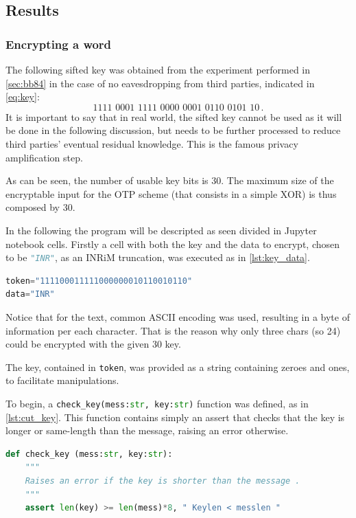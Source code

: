 \subsection{Results}

\subsubsection{Encrypting a word}
The following sifted key was obtained from the experiment performed in
\cref{sec:bb84} in the case of no eavesdropping from
third parties, indicated in \cref{eq:key}:
\begin{equation*}
  1111 \,\,  0001 \,\, 1111 \,\, 0000 \,\, 0001 \,\, 0110 \,\,
  0101 \,\, 10 \, .
\end{equation*}
It is important to say that in real world, the sifted  key
cannot be used as it will be done in the  following discussion,
but needs to be further
processed to reduce third parties' eventual residual knowledge. This
is the famous privacy
amplification step.

As can be seen, the number of usable key bits is 30.
The maximum size of the encryptable input for the OTP scheme
(that consists in a simple XOR) is thus
composed by \SI{30}{\bit}.

In the following the program will be descripted as seen divided in
Jupyter notebook cells. Firstly a cell with both the key
and the data to encrypt,
chosen to be \lstinline[language=Python]|"INR"|, as an INRiM
truncation, was executed as in
\cref{lst:key_data}.
\begin{lstlisting}[basicstyle=\ttfamily\footnotesize, language=python, caption=Cell with the initial data. , label=lst:key_data, float=h ]
token="111100011111000000010110010110"
data="INR"
\end{lstlisting}
Notice that for the text, common ASCII encoding was used, resulting
in a byte of information per each character.
That is the reason why only three chars (so \SI{24}{\bit}) could be
encrypted with the given  \SI{30}{\bit} key.

The key, contained in \lstinline[language=python]|token|, was provided
as a string containing zeroes and ones, to
facilitate manipulations.

To begin, a \lstinline[language=Python]|check_key(mess:str, key:str)|
function was defined, as in \cref{lst:cut_key}. This function
contains simply an assert
that checks that the key is longer or same-length than the message,
raising an error otherwise.

\begin{lstlisting}[basicstyle=\ttfamily\footnotesize,language=python, caption=The function that checks that the key is longer or same length than the message bits. , label=lst:cut_key ,float=h ]
def check_key (mess:str, key:str):
    """
    Raises an error if the key is shorter than the message .
    """
    assert len(key) >= len(mess)*8, " Keylen < messlen "

\end{lstlisting}

